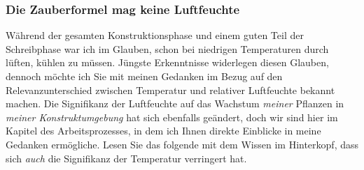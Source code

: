 \documentclass[12pt,titlepage,a4paper]{article}
\begin{document}
\subsubsection{Die Zauberformel mag keine Luftfeuchte}
Während der gesamten Konstruktionsphase und einem guten Teil der Schreibphase war ich im Glauben, schon bei niedrigen Temperaturen durch lüften, kühlen zu müssen. Jüngste Erkenntnisse widerlegen diesen Glauben, dennoch möchte ich Sie mit meinen Gedanken im Bezug auf den Relevanzunterschied zwischen Temperatur und relativer Luftfeuchte bekannt machen. Die Signifikanz der Luftfeuchte auf das Wachstum \textit{meiner} Pflanzen in \textit{meiner Konstruktumgebung} hat sich ebenfalls geändert, doch wir sind hier im Kapitel des Arbeitsprozesses, in dem ich Ihnen direkte Einblicke in meine Gedanken ermögliche. Lesen Sie das folgende mit dem Wissen im Hinterkopf, dass sich \textit{auch} die Signifikanz der Temperatur verringert hat.\\\\
\end{document}
